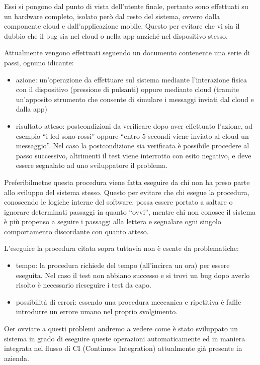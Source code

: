 \documentclass{article}
\begin{document}
Essi si pongono dal punto di vista dell'utente finale, pertanto sono effettuati su un
hardware completo, isolato però dal resto del sistema, ovvero dalla componente cloud
e dall'applicazione mobile. Questo per evitare che vi sia il dubbio che il bug sia
nel cloud o nella app anziché nel dispositivo stesso.

Attualmente vengono effettuati seguendo un documento contenente una serie di passi, ognuno
idicante:

\begin{itemize}
    \item azione: un'operazione da effettuare sul sistema mediante l'interazione fisica
        con il dispositivo (pressione di pulsanti) oppure mediante cloud (tramite un'apposito
        strumento che consente di simulare i messaggi inviati dal cloud e dalla app)
    \item risultato atteso: postcondizioni da verificare dopo aver effettuato l'azione, ad
        esempio ``i led sono rossi'' oppure ``entro 5 secondi viene inviato al cloud un messaggio''.
        Nel caso la postcondizione sia verificata è possibile procedere al passo successivo, altrimenti
        il test viene interrotto con esito negativo, e deve essere segnalato ad uno sviluppatore il problema.
\end{itemize}

Preferibilmetne questa procedura viene fatta eseguire da chi non ha preso parte allo
sviluppo del sistema stesso. Questo per evitare che chi esegue la procedura, conoscendo
le logiche interne del software, possa essere portato a saltare o ignorare determinati
passaggi in quanto ``ovvi'', mentre chi non conosce il sistema è più propenso a seguire
i passaggi alla lettera e segnalare ogni singolo comportamento discordante con quanto
atteso.

L'eseguire la procedura citata sopra tuttavia non è esente da problematiche:

\begin{itemize}
    \item tempo: la procedura richiede del tempo (all'incirca un ora) per essere eseguita.
        Nel caso il test non abbiano successo e si trovi un bug dopo averlo risolto è necessario
        rieseguire i test da capo.
    \item possibilità di errori: essendo una procedura meccanica e ripetitiva è fafile
        introdurre un errore umano nel proprio svolgimento.
\end{itemize}

Oer ovviare a questi problemi andremo a vedere come è stato sviluppato un sistema in
grado di eseguire queste operazioni automaticamente ed in maniera integrata nel flusso
di CI (Continuos Integration) attualmente già presente in azienda.
\end{document}
